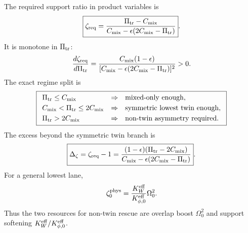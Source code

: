 The required support ratio in product variables is
\begin{equation}
\label{eq:app-stage052-zeta-req}
\boxed{
\zeta_{\rm req}
=\frac{\Pi_{\rm tr}-C_{\rm mix}}
{C_{\rm mix}-\epsilon(2C_{\rm mix}-\Pi_{\rm tr})}}.
\end{equation}
It is monotone in \(\Pi_{\rm tr}\):
\begin{equation}
\label{eq:app-stage052-zeta-derivative}
\frac{d\zeta_{\rm req}}{d\Pi_{\rm tr}}
=\frac{C_{\rm mix}(1-\epsilon)}{[C_{\rm mix}-\epsilon(2C_{\rm mix}-\Pi_{\rm tr})]^2}>0.
\end{equation}
The exact regime split is
\begin{equation}
\label{eq:app-stage052-regimes}
\boxed{
\begin{array}{lll}
\Pi_{\rm tr}\leq C_{\rm mix} &\Rightarrow& \text{mixed-only enough},\\[0.25em]
C_{\rm mix}<\Pi_{\rm tr}\leq2C_{\rm mix} &\Rightarrow& \text{symmetric lowest twin enough},\\[0.25em]
\Pi_{\rm tr}>2C_{\rm mix} &\Rightarrow& \text{non-twin asymmetry required}.
\end{array}}
\end{equation}
The excess beyond the symmetric twin branch is
\begin{equation}
\label{eq:app-stage052-Dzeta}
\boxed{
\Delta_\zeta=\zeta_{\rm req}-1
=\frac{(1-\epsilon)(\Pi_{\rm tr}-2C_{\rm mix})}
{C_{\rm mix}-\epsilon(2C_{\rm mix}-\Pi_{\rm tr})}}.
\end{equation}
For a general lowest lane,
\begin{equation}
\label{eq:app-stage052-zeta0-general}
\zeta_0^{\rm phys}=\frac{K_W^{\rm eff}}{K_{\phi,0}^{\rm eff}}\Omega_0^2.
\end{equation}
Thus the two resources for non-twin rescue are overlap boost \(\Omega_0^2\) and support softening \(K_W^{\rm eff}/K_{\phi,0}^{\rm eff}\).


